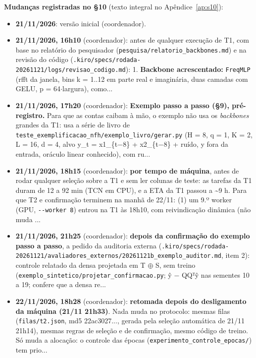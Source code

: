 \documentclass[11pt,a4paper]{article}
\begin{document}
\textbf{Mudanças registradas no \S{}10} (texto integral no Apêndice~\ref{ap:s10}):
\begin{itemize}\setlength{\itemsep}{0pt}
\item \textbf{21/11/2026}: versão inicial (coordenador).
\item \textbf{21/11/2026, 16h10} (coordenador): antes de qualquer execução de T1, com base no relatório do pesquisador (\texttt{pesquisa/\allowbreak{}relatorio\_\allowbreak{}backbones.\allowbreak{}md}) e na revisão do código (\texttt{.\allowbreak{}kiro/\allowbreak{}specs/\allowbreak{}rodada-\allowbreak{}20261121/\allowbreak{}logs/\allowbreak{}revisao\_\allowbreak{}codigo.\allowbreak{}md}): 1. \textbf{Backbone acrescentado:} \texttt{FreqMLP} (rfft da janela, bins k = 1..12 em parte real e imaginária, duas camadas com GELU, p = 64$\cdot$largura), como...
\item \textbf{21/11/2026, 17h20} (coordenador): \textbf{Exemplo passo a passo (\S{}9), pré-registro.} Para que as contas caibam à mão, o exemplo não usa os \emph{backbones} grandes da T1: usa a série de livro de \texttt{teste\_\allowbreak{}exemplificacao\_\allowbreak{}nfh/\allowbreak{}exemplo\_\allowbreak{}livro/\allowbreak{}gerar.\allowbreak{}py} (H = 8, q = 1, K = 2, L = 16, d = 4, alvo y\_t = x1\_\{t$-$8\} + x2\_\{t$-$8\} + ruído, y fora da entrada, oráculo linear conhecido), com ru...
\item \textbf{21/11/2026, 18h15} (coordenador): \textbf{por tempo de máquina}, antes de rodar qualquer seleção sobre a T1 e sem ler colunas de teste: as tarefas da T1 duram de 12 a 92 min (TCN em CPU), e a ETA da T1 passou a \textasciitilde{}9 h. Para que T2 e confirmação terminem na manhã de 22/11: (1) um 9.º worker (GPU, \texttt{-\allowbreak{}-\allowbreak{}worker 8}) entrou na T1 às 18h10, com reivindicação dinâmica (não muda ...
\item \textbf{21/11/2026, 21h25} (coordenador): \textbf{depois da confirmação do exemplo passo a passo}, a pedido da auditoria externa (\texttt{.\allowbreak{}kiro/\allowbreak{}specs/\allowbreak{}rodada-\allowbreak{}20261121/\allowbreak{}avaliadores\_\allowbreak{}externos/\allowbreak{}20261121b\_\allowbreak{}exemplo\_\allowbreak{}auditor.\allowbreak{}md}, item 2): controle relatado da densa projetada em T $\oplus$ S, sem treino (\texttt{exemplo\_\allowbreak{}sintetico/\allowbreak{}projetar\_\allowbreak{}confirmacao.\allowbreak{}py}; ŷ $-$ QQᵀŷ nas sementes 10 a 19; confere que a densa re...
\item \textbf{22/11/2026, 18h28} (coordenador): \textbf{retomada depois do desligamento da máquina (21/11 21h33)}. Nada muda no protocolo: mesmas filas (\texttt{filas/\allowbreak{}t2.\allowbreak{}json}, md5 22ac3027..., gerada pela seleção automática de 21/11 21h14), mesmas regras de seleção e de confirmação, mesmo código de treino. Só muda a alocação: o controle das épocas (\texttt{experimento\_\allowbreak{}controle\_\allowbreak{}epocas/\allowbreak{}}) tem prio...

\end{itemize}
\end{document}
